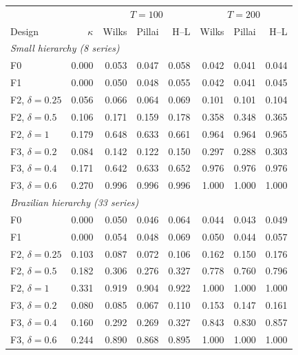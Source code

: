 \centering\small
\begin{tabular}{lrrrrrrr}
\hline
 & & \multicolumn{3}{c}{$T = 100$} & \multicolumn{3}{c}{$T = 200$} \\
Design & $\kappa$ & Wilks & Pillai & H--L & Wilks & Pillai & H--L \\
\hline
\multicolumn{8}{l}{\emph{Small hierarchy (8 series)}} \\
F0 & 0.000 & 0.053 & 0.047 & 0.058 & 0.042 & 0.041 & 0.044 \\
F1 & 0.000 & 0.050 & 0.048 & 0.055 & 0.042 & 0.041 & 0.045 \\
F2, $\delta = 0.25$ & 0.056 & 0.066 & 0.064 & 0.069 & 0.101 & 0.101 & 0.104 \\
F2, $\delta = 0.5$ & 0.106 & 0.171 & 0.159 & 0.178 & 0.358 & 0.348 & 0.365 \\
F2, $\delta = 1$ & 0.179 & 0.648 & 0.633 & 0.661 & 0.964 & 0.964 & 0.965 \\
F3, $\delta = 0.2$ & 0.084 & 0.142 & 0.122 & 0.150 & 0.297 & 0.288 & 0.303 \\
F3, $\delta = 0.4$ & 0.171 & 0.642 & 0.633 & 0.652 & 0.976 & 0.976 & 0.976 \\
F3, $\delta = 0.6$ & 0.270 & 0.996 & 0.996 & 0.996 & 1.000 & 1.000 & 1.000 \\
\multicolumn{8}{l}{\emph{Brazilian hierarchy (33 series)}} \\
F0 & 0.000 & 0.050 & 0.046 & 0.064 & 0.044 & 0.043 & 0.049 \\
F1 & 0.000 & 0.054 & 0.048 & 0.069 & 0.050 & 0.044 & 0.057 \\
F2, $\delta = 0.25$ & 0.103 & 0.087 & 0.072 & 0.106 & 0.162 & 0.150 & 0.176 \\
F2, $\delta = 0.5$ & 0.182 & 0.306 & 0.276 & 0.327 & 0.778 & 0.760 & 0.796 \\
F2, $\delta = 1$ & 0.331 & 0.919 & 0.904 & 0.922 & 1.000 & 1.000 & 1.000 \\
F3, $\delta = 0.2$ & 0.080 & 0.085 & 0.067 & 0.110 & 0.153 & 0.147 & 0.161 \\
F3, $\delta = 0.4$ & 0.160 & 0.292 & 0.269 & 0.327 & 0.843 & 0.830 & 0.857 \\
F3, $\delta = 0.6$ & 0.244 & 0.890 & 0.868 & 0.895 & 1.000 & 1.000 & 1.000 \\
\hline
\end{tabular}
